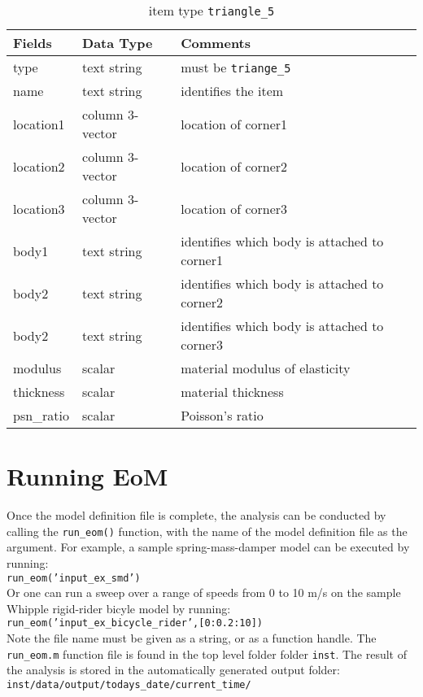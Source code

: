 \begin{table}[!h]
\caption{item type \texttt{triangle\_5}}
\label{triangle5}
\begin{center}
\begin{tabular}{lll}
\toprule
Fields & Data Type & Comments\\
\midrule
type & text string & must be \texttt{triange\_5}\\
name & text string & identifies the item\\
location1 & column 3-vector & location of corner1\\
location2 & column 3-vector & location of corner2\\
location3 & column 3-vector & location of corner3\\
body1 & text string & identifies which body is attached to corner1\\
body2 & text string & identifies which body is attached to corner2\\
body2 & text string & identifies which body is attached to corner3\\
modulus & scalar & material modulus of elasticity\\
thickness & scalar & material thickness\\
psn\_ratio & scalar & Poisson's ratio\\
\bottomrule
\end{tabular}
\end{center}
\end{table}
\clearpage

\section{Running EoM}
Once the model definition file is complete, the analysis can be conducted by calling the \texttt{run\_eom()} function, with the name of the model definition file as the argument.  For example, a sample spring-mass-damper model can be executed by running:\\ \texttt{run\_eom('input\_ex\_smd')}\\  Or one can run a sweep over a range of speeds from 0 to 10 m/s on the sample Whipple rigid-rider bicyle model by running:\\ \texttt{run\_eom('input\_ex\_bicycle\_rider',[0:0.2:10])}\\  Note the file name must be given as a string, or as a function handle.  The \texttt{run\_eom.m} function file is found in the top level folder folder \texttt{inst}.  The result of the analysis is stored in the automatically generated output folder:\\ \texttt{inst/data/output/todays\_date/current\_time/}

